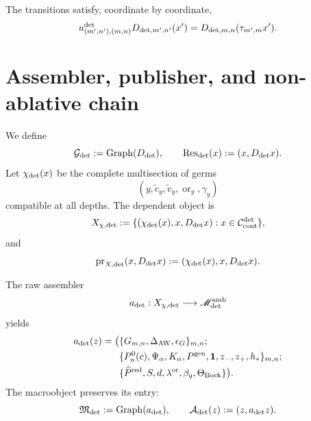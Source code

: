 The transitions satisfy, coordinate by coordinate,
\begin{equation}\label{eq:detint-naturalidad-trece}
 u^{\rm det}_{(m',n'),(m,n)}D_{{\rm det},m',n'}(x')
 =D_{{\rm det},m,n}(\tau_{m',m}x').
\end{equation}

\section{Assembler, publisher, and non-ablative chain}

We define
\begin{equation}\label{eq:detint-graph-d}
 \mathcal G_{\rm det}:=\operatorname{Graph}(D_{\rm det}),
 \qquad
 \operatorname{Res}_{\rm det}(x):=(x,D_{\rm det}x).
\end{equation}
Let \(\chi_{\rm det}(x)\) be the complete multisection of germs
\[
 (y,\widetilde c_y,\widetilde v_y,\operatorname{or}_y,\gamma_y)
\]
compatible at all depths. The dependent object is
\begin{equation}\label{eq:detint-x-dependiente}
 X_{\chi,{\rm det}}
 :=\{(\chi_{\rm det}(x),x,D_{\rm det}x):
 x\in\mathcal C_{\rm cont}^{\rm det}\},
\end{equation}
and
\begin{equation}\label{eq:detint-prx}
 \operatorname{pr}_{X,{\rm det}}(x,D_{\rm det}x)
 :=(\chi_{\rm det}(x),x,D_{\rm det}x).
\end{equation}

The raw assembler
\begin{equation}\label{eq:detint-ensamblador-crudo}
 a_{\rm det}:X_{\chi,{\rm det}}\longrightarrow
 \mathscr M_{\rm det}^{\rm amb}
\end{equation}
yields
\begin{equation}\label{eq:detint-ensamblador-salida}
\begin{split}
 a_{\rm det}(z)=\bigl(&
 \{G_{m,n},\Delta_{\rm AW},\epsilon_G\}_{m,n};\\
 &\{P_n^0(c),\Psi_\alpha,K_\alpha,P^{\rm gen},
 \mathbf1,z_-,z_+,h_*\}_{m,n};\\
 &\{\widehat P^{\rm red},S,d,\lambda^{\rm or},
 \beta_q,\Theta_{\rm Bock}\}\bigr).
\end{split}
\end{equation}
The macroobject preserves its entry:
\begin{equation}\label{eq:detint-graph-a}
 \mathfrak M_{\rm det}:=\operatorname{Graph}(a_{\rm det}),
 \qquad
 \mathcal A_{\rm det}(z):=(z,a_{\rm det}z).
\end{equation}

